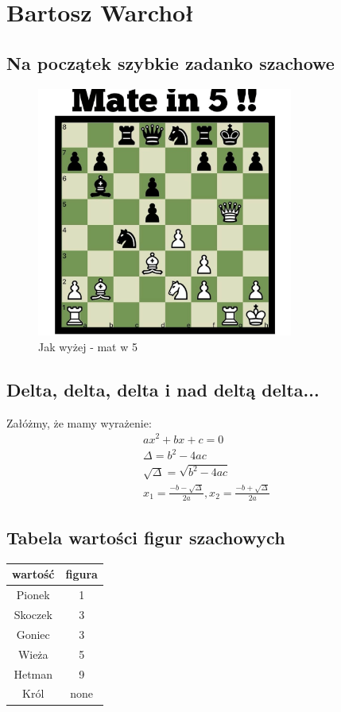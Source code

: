 \section{Bartosz Warchoł}

\subsection{Na początek szybkie zadanko szachowe}
\begin{figure}[h]
    \centering
    \includegraphics[width=0.75\textwidth]{pictures/tactic.jpg}
    \caption{Jak wyżej - mat w 5}
    \label{chess position}
\end{figure}

\subsection{Delta, delta, delta i nad deltą delta...}

Załóżmy, że mamy wyrażenie:
\begin{equation*}
      \begin{split}
      ax^2 + bx + c = 0\\
      \Delta = b^2 - 4ac\\
      \sqrt{\Delta} = \sqrt{b^2 - 4ac}\\
      x_1 = \frac{-b - \sqrt{\Delta}}{2a}, 
      x_2 = \frac{-b + \sqrt{\Delta}}{2a}
    \end{split}
\end{equation*}

\subsection{Tabela wartości figur szachowych}
\begin{tabular}{ |c|c| } 
        \hline
         wartość & figura \\
         \hline
         \hline
        Pionek & 1 \\
        Skoczek & 3 \\
        Goniec & 3 \\
        Wieża & 5 \\
        Hetman & 9 \\
        Król & none \\
        \hline
    \end{tabular}


